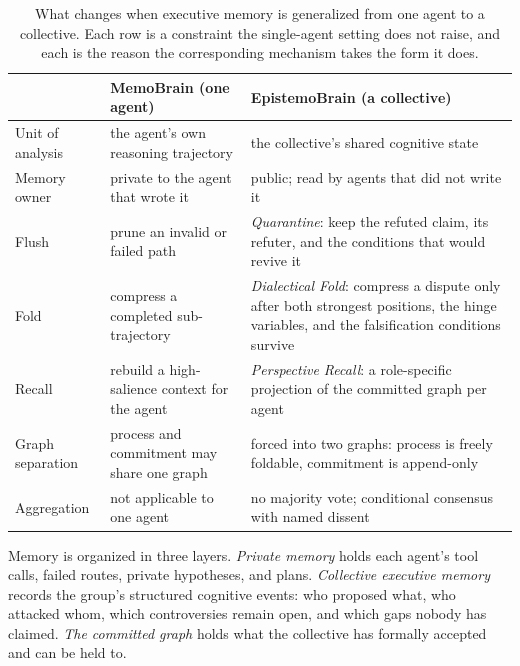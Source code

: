 \begin{table}[t]
\centering
\small
\setlength{\tabcolsep}{4pt}
\begin{tabular}{@{}p{2.5cm} p{5.6cm} p{6.4cm}@{}}
\toprule
 & \textbf{MemoBrain (one agent)} & \textbf{EpistemoBrain (a collective)} \\
\midrule
Unit of analysis & the agent's own reasoning trajectory & the collective's shared cognitive state \\
Memory owner & private to the agent that wrote it & public; read by agents that did not write it \\
Flush & prune an invalid or failed path & \emph{Quarantine}: keep the refuted claim, its refuter, and the conditions that would revive it \\
Fold & compress a completed sub-trajectory & \emph{Dialectical Fold}: compress a dispute only after both strongest positions, the hinge variables, and the falsification conditions survive \\
Recall & rebuild a high-salience context for the agent & \emph{Perspective Recall}: a role-specific projection of the committed graph per agent \\
Graph separation & process and commitment may share one graph & forced into two graphs: process is freely foldable, commitment is append-only \\
Aggregation & not applicable to one agent & no majority vote; conditional consensus with named dissent \\
\bottomrule
\end{tabular}
\caption{What changes when executive memory is generalized from one agent to
a collective. Each row is a constraint the single-agent setting does not raise,
and each is the reason the corresponding mechanism takes the form it does.}
\label{tab:generalization}
\end{table}

Memory is organized in three layers. \emph{Private memory} holds each agent's
tool calls, failed routes, private hypotheses, and plans. \emph{Collective
executive memory} records the group's structured cognitive events: who proposed
what, who attacked whom, which controversies remain open, and which gaps nobody
has claimed. \emph{The committed graph} holds what the collective has formally
accepted and can be held to.

